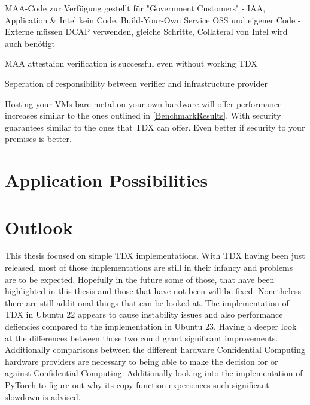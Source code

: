 MAA-Code zur Verfügung gestellt für "Government Customers"
- IAA, Application \& Intel kein Code, Build-Your-Own Service OSS und eigener Code
- Externe müssen DCAP verwenden, gleiche Schritte, Collateral von Intel wird auch benötigt



MAA attestaion verification is successful even without working TDX

Seperation of responsibility between verifier and infrastructure provider

Hosting your VMs bare metal on your own hardware will offer performance increases similar to the ones outlined in \ref{BenchmarkResults}. With security guarantees similar to the ones that TDX can offer. Even better if security to your premises is better.

\todo{}


\section{Application Possibilities}




\section{Outlook}

This thesis focused on simple TDX implementations. With TDX having been just released, most of those implementations are still in their infancy and problems are to be expected. Hopefully in the future some of those, that have been highlighted in this thesis and those that have not been will be fixed. Nonetheless there are still additional things that can be looked at. The implementation of TDX in Ubuntu 22 appears to cause instability issues and also performance defiencies compared to the implementation in Ubuntu 23. Having a deeper look at the differences between those two could grant significant improvements. Additionally comparisons between the different hardware Confidential Computing hardware providers are necessary to being able to make the decision for or against Confidential Computing. Additionally looking into the implementation of PyTorch to figure out why its copy function experiences such significant slowdown is advised. 

